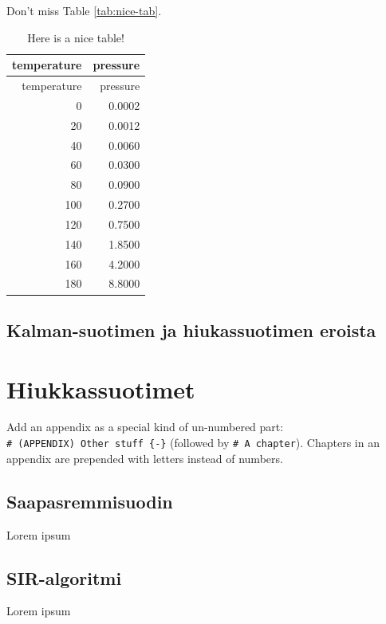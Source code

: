 \documentclass[
  12pt,
  a4paper, twoside]{book}
\theoremstyle{definition}
\theoremstyle{definition}
\theoremstyle{definition}
\theoremstyle{definition}
\theoremstyle{remark}
\begin{document}
Don't miss Table \ref{tab:nice-tab}.

\begin{longtable}[]{@{}rr@{}}
\caption{Here is a nice table!}\tabularnewline
\toprule
temperature & pressure \\
\midrule
\endfirsthead
\toprule
temperature & pressure \\
\midrule
\endhead
0 & 0.0002 \\
20 & 0.0012 \\
40 & 0.0060 \\
60 & 0.0300 \\
80 & 0.0900 \\
100 & 0.2700 \\
120 & 0.7500 \\
140 & 1.8500 \\
160 & 4.2000 \\
180 & 8.8000 \\
\bottomrule
\end{longtable}

\hypertarget{kalman-suotimen-ja-hiukassuotimen-eroista}{%
\section{Kalman-suotimen ja hiukassuotimen eroista}\label{kalman-suotimen-ja-hiukassuotimen-eroista}}

\hypertarget{hiukkassuotimet}{%
\chapter{Hiukkassuotimet}\label{hiukkassuotimet}}

Add an appendix as a special kind of un-numbered part: \texttt{\#\ (APPENDIX)\ Other\ stuff\ \{-\}} (followed by \texttt{\#\ A\ chapter}). Chapters in an appendix are prepended with letters instead of numbers.

\hypertarget{saapasremmisuodin}{%
\section{Saapasremmisuodin}\label{saapasremmisuodin}}

Lorem ipsum

\hypertarget{sir-algoritmi}{%
\section{SIR-algoritmi}\label{sir-algoritmi}}

Lorem ipsum
\end{document}
